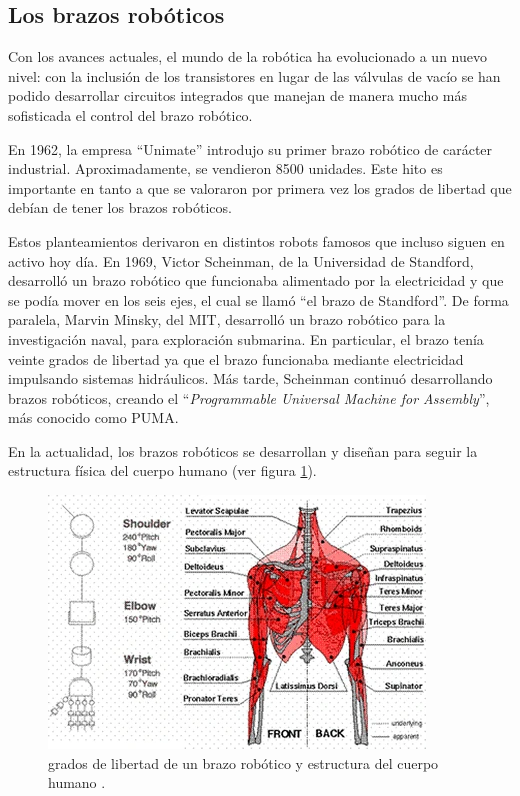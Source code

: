 \subsection{Los brazos robóticos}

Con los avances actuales, el mundo de la robótica ha evolucionado a un nuevo nivel: con la inclusión
de los transistores en lugar de las válvulas de vacío se han podido desarrollar circuitos integrados
que manejan de manera mucho más sofisticada el control del brazo robótico.

En 1962, la empresa ``Unimate'' introdujo su primer brazo robótico de carácter industrial. Aproximadamente,
se vendieron 8500 unidades. Este hito es importante en tanto a que se valoraron por primera vez los
grados de libertad que debían de tener los brazos robóticos. 

Estos planteamientos derivaron en distintos robots famosos que incluso siguen en activo hoy día. En
1969, Victor Scheinman, de la Universidad de Standford, desarrolló un brazo robótico que funcionaba
alimentado por la electricidad y que se podía mover en los seis ejes, el cual se llamó ``el brazo de
Standford''. De forma paralela, Marvin Minsky, del MIT, desarrolló un brazo robótico para la investigación
naval, para exploración submarina. En particular, el brazo tenía veinte grados de libertad ya que el brazo
funcionaba mediante electricidad impulsando sistemas hidráulicos. Más tarde, Scheinman continuó
desarrollando brazos robóticos, creando el ``\textit{Programmable Universal Machine for Assembly}'',
más conocido como PUMA.

En la actualidad, los brazos robóticos se desarrollan y diseñan para seguir la estructura física
del cuerpo humano (ver figura \ref{fig:human_body}).

\begin{figure}[H]
    \centering
    \includegraphics[width=.65\linewidth]{pictures/human_body.png}
    \caption{grados de libertad de un brazo robótico y estructura del cuerpo humano \cite{moran_evolution_2007}.}
    \label{fig:human_body}
\end{figure}


